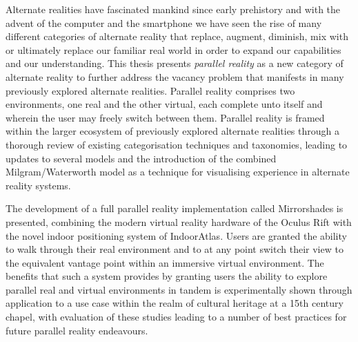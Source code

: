 Alternate realities have fascinated mankind since early prehistory and with the advent of the computer and the smartphone we have seen the rise of many different categories of alternate reality that replace, augment, diminish, mix with or ultimately replace our familiar real world in order to expand our capabilities and our understanding. This thesis presents \textit{parallel reality} as a new category of alternate reality to further address the vacancy problem that manifests in many previously explored alternate realities. Parallel reality comprises two environments, one real and the other virtual, each complete unto itself and wherein the user may freely switch between them. Parallel reality is framed within the larger ecosystem of previously explored alternate realities through a thorough review of existing categorisation techniques and taxonomies, leading to updates to several models and the introduction of the combined Milgram/Waterworth model as a technique for visualising experience in alternate reality systems.

The development of a full parallel reality implementation called Mirrorshades is presented, combining the modern virtual reality hardware of the Oculus Rift with the novel indoor positioning system of IndoorAtlas. Users are granted the ability to walk through their real environment and to at any point switch their view to the equivalent vantage point within an immersive virtual environment. The benefits that such a system provides by granting users the ability to explore parallel real and virtual environments in tandem is experimentally shown through application to a use case within the realm of cultural heritage at a 15th century chapel, with evaluation of these studies leading to a number of best practices for future parallel reality endeavours.